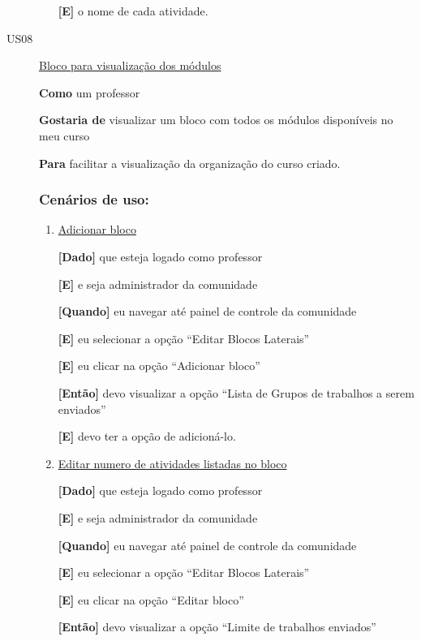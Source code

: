 \begin{description}
\begin{enumerate}
\textbf{[E]} o nome de cada atividade.

\end{enumerate}


\item [US08\label{us08}] \underline{Bloco para visualização dos módulos}

\textbf{Como} um professor

\textbf{Gostaria de} visualizar um bloco com todos os módulos disponíveis no meu curso

\textbf{Para} facilitar a visualização da organização do curso criado.

\subsubsection*{Cenários de uso:}

\begin{enumerate}

\item \underline{Adicionar bloco}

\textbf{[Dado]} que esteja logado como professor

\textbf{[E]} e seja administrador da comunidade

\textbf{[Quando]} eu navegar até painel de controle da comunidade

\textbf{[E]} eu selecionar a opção ``Editar Blocos Laterais''

\textbf{[E]} eu clicar na opção ``Adicionar bloco''

\textbf{[Então]} devo visualizar a opção ``Lista de Grupos de trabalhos a serem enviados''

\textbf{[E]} devo ter a opção de adicioná-lo.

\item \underline{Editar numero de atividades listadas no bloco}

\textbf{[Dado]} que esteja logado como professor

\textbf{[E]} e seja administrador da comunidade

\textbf{[Quando]} eu navegar até painel de controle da comunidade

\textbf{[E]} eu selecionar a opção ``Editar Blocos Laterais''

\textbf{[E]} eu clicar na opção ``Editar bloco''

\textbf{[Então]} devo visualizar a opção ``Limite de trabalhos enviados''


\end{enumerate}
\end{description}
